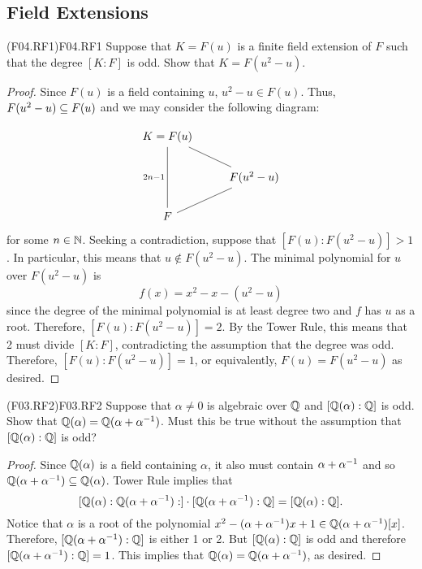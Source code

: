 \documentclass[../../AlgebraQualSolutions.tex]{subfiles}
\begin{document}
\subsection{Field Extensions}

\begin{prob}{(F04.RF1)}{F04.RF1}
	Suppose that $K = F(u)$ is a finite field extension of $F$ such that the degree $[K:F]$ is odd. Show that $K = F(u^2 - u)$.
\end{prob}

\begin{proof}
	Since $F(u)$ is a field containing $u$, $u^2 - u \in F(u)$. Thus, $F(u^2 - u) \subseteq F(u)$ and we may consider the following diagram:

	\[\begin{tikzcd}
		K = F(u) \ar[dd, no head,"2n - 1"'] \ar[dr, no head] & \\
		 & F(u^2 - u) \ar[dl, no head] \\
		 F &
	\end{tikzcd}\]
	for some $n \in \mathbb{N}$. Seeking a contradiction, suppose that $[F(u): F(u^2 - u)] > 1$. In particular, this means that $u \not\in F(u^2 - u)$. The minimal polynomial for $u$ over $F(u^2 - u)$ is 
		\[f(x) = x^2 - x - (u^2 - u)\]
	since the degree of the minimal polynomial is at least degree two and $f$ has $u$ as a root. Therefore, $[F(u): F(u^2 - u)] = 2$. By the Tower Rule, this means that 2 must divide $[K: F]$, contradicting the assumption that the degree was odd. Therefore, $[F(u): F(u^2 - u)] = 1$, or equivalently, $F(u) =  F(u^2 - u)$ as desired.
\end{proof}


\begin{prob}{(F03.RF2)}{F03.RF2}
	Suppose that $\alpha \neq 0$ is algebraic over $\mathbb{Q}$ and $[\mathbb{Q}(\alpha): \mathbb{Q}]$ is odd. Show that $\mathbb{Q}(\alpha) = \mathbb{Q}(\alpha + \alpha^{-1})$. Must this be true without the assumption that $[\mathbb{Q}(\alpha): \mathbb{Q}]$ is odd?
\end{prob}

\begin{proof}
	Since $\mathbb{Q}(\alpha)$ is a field containing $\alpha$, it also must contain $\alpha + \alpha^{-1}$ and so $\mathbb{Q}(\alpha + \alpha^{-1}) \subseteq \mathbb{Q}(\alpha)$. Tower Rule implies that
		\[[\mathbb{Q}(\alpha): \mathbb{Q}(\alpha + \alpha^{-1}):] \cdot [\mathbb{Q}(\alpha + \alpha^{-1}): \mathbb{Q}] = [\mathbb{Q}(\alpha): \mathbb{Q}].\]
	Notice that $\alpha$ is a root of the polynomial $x^2 - (\alpha + \alpha^{-1})x + 1 \in \mathbb{Q}(\alpha + \alpha^{-1})[x]$. Therefore, $[\mathbb{Q}(\alpha + \alpha^{-1}): \mathbb{Q}]$ is either 1 or 2. But $[\mathbb{Q}(\alpha): \mathbb{Q}]$ is odd and therefore $[\mathbb{Q}(\alpha + \alpha^{-1}): \mathbb{Q}] = 1$. This implies that $\mathbb{Q}(\alpha) = \mathbb{Q}(\alpha + \alpha^{-1})$, as desired.
\end{proof}
\end{document}
